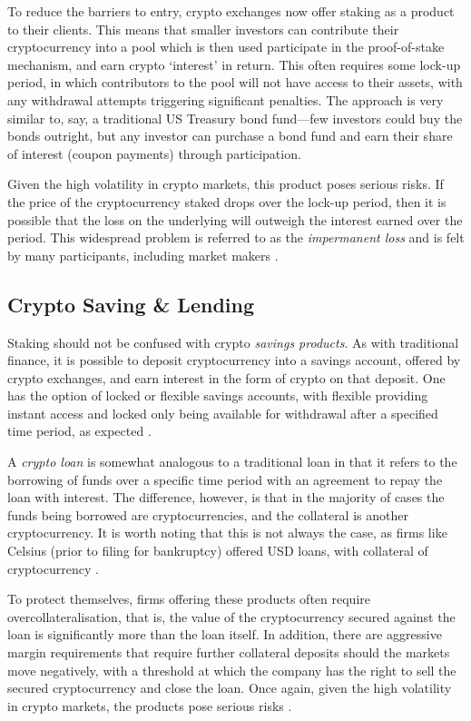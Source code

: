 To reduce the barriers to entry, crypto exchanges now offer staking as a product to their clients. This means that smaller investors can contribute their cryptocurrency into a pool which is then used participate in the proof-of-stake mechanism, and earn crypto `interest' in return. This often requires some lock-up period, in which contributors to the pool will not have access to their assets, with any withdrawal attempts triggering significant penalties. The approach is very similar to, say, a traditional US Treasury bond fund––few investors could buy the bonds outright, but any investor can purchase a bond fund and earn their share of interest (coupon payments) through participation. 

Given the high volatility in crypto markets, this product poses serious risks. If the price of the cryptocurrency staked drops over the lock-up period, then it is possible that the loss on the underlying will outweigh the interest earned over the period. This widespread problem is referred to as the \textit{impermanent loss} and is felt by many participants, including market makers \citep{crypto_staking}.

\subsection{Crypto Saving \& Lending}
Staking should not be confused with crypto \textit{savings products}. As with traditional finance, it is possible to deposit cryptocurrency into a savings account, offered by crypto exchanges, and earn interest in the form of crypto on that deposit. One has the option of locked or flexible savings accounts, with flexible providing instant access and locked only being available for withdrawal after a specified time period, as expected \citep{crypto_saving}.

A \textit{crypto loan} is somewhat analogous to a traditional loan in that it refers to the borrowing of funds over a specific time period with an agreement to repay the loan with interest. The difference, however, is that in the majority of cases the funds being borrowed are cryptocurrencies, and the collateral is another cryptocurrency. It is worth noting that this is not always the case, as firms like Celsius (prior to filing for bankruptcy) offered USD loans, with collateral of cryptocurrency \citep{celsius}. 

To protect themselves, firms offering these products often require overcollateralisation, that is, the value of the cryptocurrency secured against the loan is significantly more than the loan itself. In addition, there are aggressive margin requirements that require further collateral deposits should the markets move negatively, with a threshold at which the company has the right to sell the secured cryptocurrency and close the loan. Once again, given the high volatility in crypto markets, the products pose serious risks \citep{crypto_loan}.

